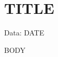\documentclass[12pt]{article}
\begin{document}
\section*{{{TITLE}}}
\hfill Data: {{DATE}}

{{BODY}}
\end{document}
